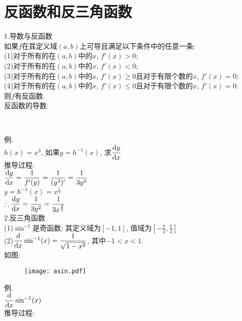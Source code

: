 \chapter{反函数和反三角函数}
1.导数与反函数\\
如果$f$在其定义域$(a,b)$上可导且满足以下条件中的任意一条:\\
(1)对于所有的在$(a,b)$中的$x$, $f'(x)>0$;\\
(2)对于所有的在$(a,b)$中的$x$, $f'(x)<0$;\\
(3)对于所有的在$(a,b)$中的$x$, $f'(x)\geqslant 0$且对于有限个数的$x$, $f'(x)=0$;\\
(4)对于所有的在$(a,b)$中的$x$, $f'(x)\leqslant 0$且对于有限个数的$x$, $f'(x)=0$.\\
则$f$有反函数.\\[2ex]

反函数的导数:
\begin{center}
\\[1ex]
\end{center}
例.\\
\phantom{例}$h(x)=x^3$, 如果$y=h^{-1}(x)$, 求$\displaystyle\frac{\mathop{}\!\mathrm{d} y}{\mathop{}\!\mathrm{d} x}$\\
推导过程:\\
$\displaystyle\frac{\mathop{}\!\mathrm{d} y}{\mathop{}\!\mathrm{d} x}=\frac{1}{f'(y)}=\frac{1}{(y^3)'}=\frac{1}{3y^2}$\\
$\displaystyle y=h^{-1}(x)=x^{\frac{1}{3}}$\\
$\displaystyle\therefore\frac{\mathop{}\!\mathrm{d} y}{\mathop{}\!\mathrm{d} x}=\frac{1}{3y^2}=\frac{1}{3x^{\frac{2}{3}}}$\\[2ex]

2.反三角函数\\
(1)$\sin^{-1}$是奇函数; 其定义域为$[-1,1]$, 值域为$\displaystyle[-\frac{\pi}{2},\frac{\pi}{2}]$\\[1ex]
(2)$\displaystyle\frac{\mathop{}\!\mathrm{d} }{\mathop{}\!\mathrm{d} x}\sin^{-1}(x)=\frac{1}{\sqrt{1-x^2}}$, 其中$-1<x<1$.\\[1ex]
如图:
\begin{figure}[H]
\centering
	\texttt{[image: asin.pdf]}
\end{figure}
例.\\
\phantom{例}$\displaystyle\frac{\mathop{}\!\mathrm{d}}{\mathop{}\!\mathrm{d} x}\sin^{-1}(x)$\\
推导过程:\\

